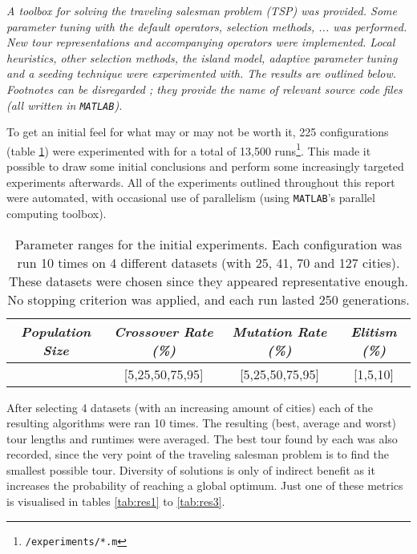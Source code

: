 
\begin{center}
\textit{A toolbox for solving the traveling salesman problem (TSP) was provided. Some parameter tuning with the default operators, selection methods, ... was performed. New tour representations and accompanying operators were implemented. Local heuristics, other selection methods, the island model, adaptive parameter tuning and a seeding technique were experimented with. The results are outlined below. Footnotes can be disregarded ; they provide the name of relevant source code files (all written in \texttt{MATLAB}).}
\end{center}


To get an initial feel for what may or may not be worth it, 225 configurations (table \ref{tab:par1}) were experimented with for a total of 13,500 runs\footnote{\texttt{/experiments/*.m}}. This made it possible to draw some initial conclusions and perform some increasingly targeted experiments afterwards. All of the experiments outlined throughout this report were automated, with occasional use of parallelism (using \texttt{MATLAB}'s parallel computing toolbox).

\begin{table}[h]
\centering
\begin{tabular}{c|c|c|c}
\textit{Population Size} & \textit{Crossover Rate (\%)} & \textit{Mutation Rate (\%)} & \textit{Elitism (\%)} \\\hline 
[150,300,1000] & [5,25,50,75,95] & [5,25,50,75,95] & [1,5,10]
\end{tabular}
\caption{Parameter ranges for the initial experiments. Each configuration was run 10 times on 4 different datasets (with 25, 41, 70 and 127 cities). These datasets were chosen since they appeared representative enough. No stopping criterion was applied, and each run lasted 250 generations. }
\label{tab:par1}
\end{table}

\noindent After selecting 4 datasets (with an increasing amount of cities) each of the resulting algorithms were ran 10 times. The resulting (best, average and worst) tour lengths and runtimes were averaged. The best tour found by each was also recorded, since the very point of the traveling salesman problem is to find the smallest possible tour. Diversity of solutions is only of indirect benefit as it increases the probability of reaching a global optimum. Just one of these metrics is visualised in tables \ref{tab:res1} to \ref{tab:res3}.\\

